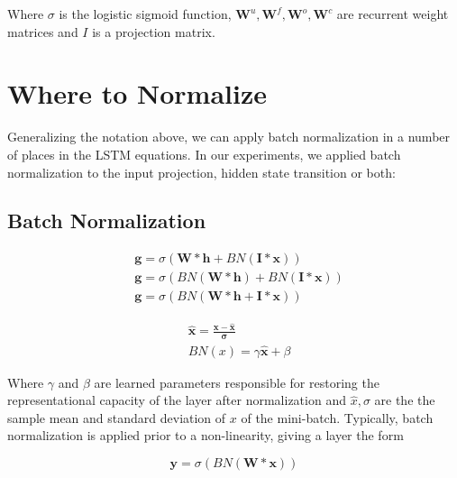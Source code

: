 \documentclass{article}
\begin{document}
Where $\sigma$ is the logistic sigmoid function, $\boldsymbol W^u, \boldsymbol W^f, \boldsymbol W^o, \boldsymbol W^c$ are recurrent weight matrices and $I$ is a projection matrix.

\section{Where to Normalize}

Generalizing the notation above, we can apply batch normalization in a number of places in the LSTM equations. In our experiments, we applied batch normalization to the input projection, hidden state transition or both:

\subsection{Batch Normalization}

\begin{equation}
	\begin{split}
		& \boldsymbol g = \sigma(\boldsymbol W * \boldsymbol h + BN(\boldsymbol I * \boldsymbol x)) \\
		& \boldsymbol g = \sigma(BN(\boldsymbol W * \boldsymbol h) + BN(\boldsymbol I * \boldsymbol x)) \\
		& \boldsymbol g = \sigma(BN(\boldsymbol W * \boldsymbol h + \boldsymbol I * \boldsymbol x)) \nonumber
	\end{split}
\end{equation}

\begin{equation}
	\begin{split}
		& \boldsymbol{\hat x} = \frac{\boldsymbol x - \boldsymbol{\hat x}}{\boldsymbol \sigma} \\
		& BN(x) = \gamma \boldsymbol{\hat x} + \beta
	\end{split}
\end{equation}

Where $\gamma$ and $\beta$ are learned parameters responsible for restoring the representational capacity of the layer after normalization and $\hat x, \sigma$ are the the sample mean and standard deviation of $x$ of the mini-batch. Typically, batch normalization is applied prior to a non-linearity, giving a layer the form

\begin{equation}
	\boldsymbol y = \sigma(BN(\boldsymbol W * \boldsymbol x))
\end{equation}
\end{document}
